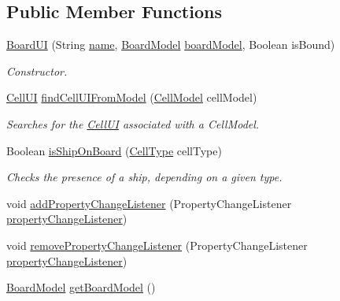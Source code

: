 \subsection*{Public Member Functions}
\begin{DoxyCompactItemize}
\item 
\hyperlink{classbattleship2D_1_1ui_1_1BoardUI_a4dcedc80daf997ceb696643f001c34f3}{Board\-U\-I} (String \hyperlink{classbattleship2D_1_1ui_1_1BoardUI_a7ad8f5d72803137c6ea6bde92a667c03}{name}, \hyperlink{classbattleship2D_1_1model_1_1BoardModel}{Board\-Model} \hyperlink{classbattleship2D_1_1ui_1_1BoardUI_a6c61b16484c780fb58e68bc8fb1494e6}{board\-Model}, Boolean is\-Bound)
\begin{DoxyCompactList}\small\item\em Constructor. \end{DoxyCompactList}\item 
\hyperlink{classbattleship2D_1_1ui_1_1CellUI}{Cell\-U\-I} \hyperlink{classbattleship2D_1_1ui_1_1BoardUI_a853812e318d4da7352b92bc4226a8310}{find\-Cell\-U\-I\-From\-Model} (\hyperlink{classbattleship2D_1_1model_1_1CellModel}{Cell\-Model} cell\-Model)
\begin{DoxyCompactList}\small\item\em Searches for the \hyperlink{classbattleship2D_1_1ui_1_1CellUI}{Cell\-U\-I} associated with a Cell\-Model. \end{DoxyCompactList}\item 
Boolean \hyperlink{classbattleship2D_1_1ui_1_1BoardUI_a571a95d38e4f6740ff5aaa27661aec39}{is\-Ship\-On\-Board} (\hyperlink{enumbattleship2D_1_1model_1_1CellType}{Cell\-Type} cell\-Type)
\begin{DoxyCompactList}\small\item\em Checks the presence of a ship, depending on a given type. \end{DoxyCompactList}\item 
void \hyperlink{classbattleship2D_1_1ui_1_1BoardUI_a4a66dac6dd3266ee5520db89ae91317e}{add\-Property\-Change\-Listener} (Property\-Change\-Listener \hyperlink{classbattleship2D_1_1ui_1_1BoardUI_a457c5910efd06093f84977cd1e464891}{property\-Change\-Listener})
\item 
void \hyperlink{classbattleship2D_1_1ui_1_1BoardUI_aee22fa9fb602146b7db935e1e9294fc5}{remove\-Property\-Change\-Listener} (Property\-Change\-Listener \hyperlink{classbattleship2D_1_1ui_1_1BoardUI_a457c5910efd06093f84977cd1e464891}{property\-Change\-Listener})
\item 
\hyperlink{classbattleship2D_1_1model_1_1BoardModel}{Board\-Model} \hyperlink{classbattleship2D_1_1ui_1_1BoardUI_aed92ed352b18fdda6de9f6a61f76c06e}{get\-Board\-Model} ()

\end{DoxyCompactItemize}

